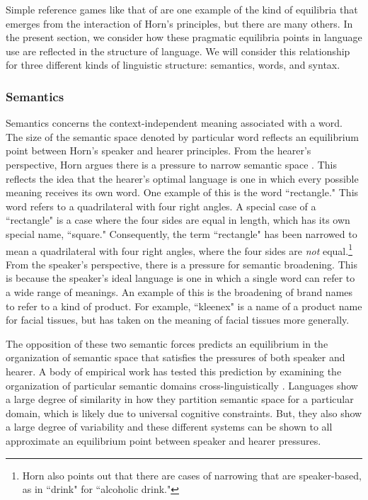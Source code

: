 \documentclass[man, noapacite, 12pt]{apa2}
\begin{document}
Simple reference games like that of  are one example of the kind of equilibria that emerges from the interaction of Horn's principles, but there are many others. In the present section, we consider how these  pragmatic equilibria points in language use are reflected in the structure of language. We will consider this relationship for three different kinds of linguistic structure: semantics, words, and syntax.

\subsubsection{Semantics}
Semantics concerns the context-independent meaning associated with a word. The size of the semantic space denoted by particular word reflects an equilibrium point between Horn's speaker and hearer principles.  From the hearer's perspective, Horn argues there is a pressure  to narrow semantic space \cite{horn1984}. This reflects the idea that the hearer's optimal language is one in which every possible meaning receives its own word. One example of this is the word ``rectangle." This word refers to a quadrilateral with four right angles. A special case of a ``rectangle"  is a case where the four sides are equal in length, which has its own special name, ``square." Consequently, the term ``rectangle" has been narrowed to mean a quadrilateral with four right angles, where the four sides are {\it not} equal.\footnote{Horn also points out that there are cases of narrowing that are speaker-based, as in ``drink" for ``alcoholic drink."} From the speaker's perspective, there is a pressure for semantic broadening. This is because the speaker's ideal language is one in which a single word can refer to a wide range of meanings. An example of this is the broadening of brand names to refer to a kind of product. For example, ``kleenex" is a name of a product name for facial tissues, but has taken on the meaning of facial tissues more generally.

The opposition of these two semantic forces predicts an equilibrium in the organization of semantic space that satisfies the pressures of both speaker and hearer. A body of empirical work has tested this prediction by examining the organization of particular semantic domains cross-linguistically \cite{regierword}. Languages show a large degree of similarity in how they partition semantic space for a particular domain, which is likely due to universal cognitive constraints. But, they also show a large degree of variability and these different systems can be shown to all approximate an equilibrium point between speaker and hearer pressures. 
\end{document}
